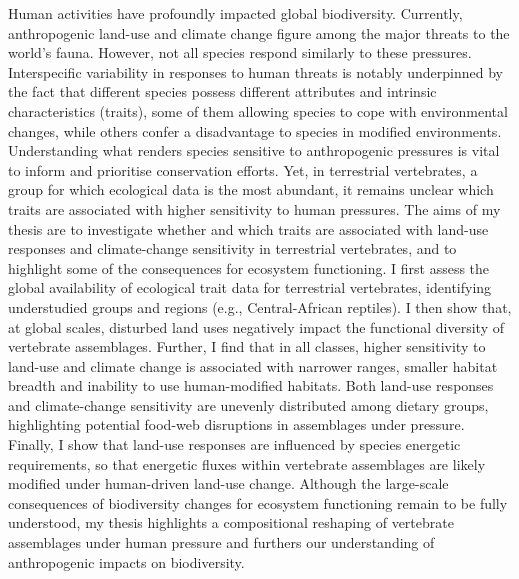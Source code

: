 
Human activities have profoundly impacted global biodiversity. Currently, anthropogenic land-use and climate change figure among the major threats to the world’s fauna. However, not all species respond similarly to these pressures. Interspecific variability in responses to human threats is notably underpinned by the fact that different species possess different attributes and intrinsic characteristics (traits), some of them allowing species to cope with environmental changes, while others confer a disadvantage to species in modified environments. Understanding what renders species sensitive to anthropogenic pressures is vital to inform and prioritise conservation efforts. Yet, in terrestrial vertebrates, a group for which ecological data is the most abundant, it remains unclear which traits are associated with higher sensitivity to human pressures.   The aims of my thesis are to investigate whether and which traits are associated with  land-use responses and climate-change sensitivity in terrestrial vertebrates, and to highlight some of the consequences for ecosystem functioning. I first assess the global availability of ecological trait data for terrestrial vertebrates, identifying understudied groups and regions (e.g., Central-African reptiles). I then show that, at global scales, disturbed land uses negatively impact the functional diversity of vertebrate assemblages.  Further, I find that in all classes, higher sensitivity to land-use and climate change is associated with  narrower ranges, smaller habitat breadth and inability to use human-modified habitats. Both land-use responses and climate-change sensitivity are unevenly distributed among dietary groups, highlighting potential food-web disruptions in assemblages under pressure.  Finally, I show that land-use responses are influenced by species energetic requirements, so that energetic fluxes within vertebrate assemblages are likely modified under human-driven land-use change. Although the large-scale consequences of biodiversity changes for ecosystem functioning remain to be fully understood, my thesis highlights a compositional reshaping of vertebrate assemblages under human pressure and furthers our understanding of anthropogenic impacts on biodiversity.  